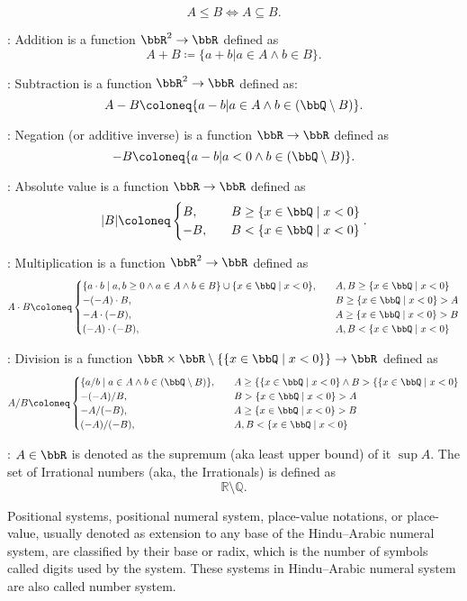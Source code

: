 \documentclass[a4paper,12pt]{report}
\begin{document}
\begin{itemizle}
\[A\leq B\iff A\subseteq B.\]
\item {}: Addition is a function $\bbR^2\to\bbR$ defined as
\[A+B\coloneq\{a+b|a\in A\land b\in B\}.\]
\item {}: Subtraction is a function $\bbR^2\to\bbR$ defined as:
\[A-B\coloneq\{a-b|a\in A\land b\in(\bbQ\setminus B)\}.\]
\item {}: Negation (or additive inverse) is a function $\bbR\to\bbR$ defined as
\[-B\coloneq\{a-b|a<0\land b\in(\bbQ\setminus B)\}.\]
\item {}: Absolute value is a function $\bbR\to\bbR$ defined as
\[|B|\coloneq\begin{cases}
B,\quad&B\geq\{x\in\bbQ\mid x<0\}\\
-B,\quad&B<\{x\in\bbQ\mid x<0\}
\end{cases}.\]
\item {}: Multiplication is a function $\bbR^2\to\bbR$ defined as
\[A\cdot B\coloneq\begin{cases}
\{a\cdot b\mid a,b\geq 0\land a\in A\land b\in B\}\cup\{x\in\bbQ\mid x<0\},\quad&A,B\geq\{x\in\bbQ\mid x<0\}\\
-(-A)\cdot B,\quad&B\geq\{x\in\bbQ\mid x<0\}>A\\
-A\cdot (-B),\quad&A\geq\{x\in\bbQ\mid x<0\}>B\\
(-A)\cdot (-B),\quad&A,B<\{x\in\bbQ\mid x<0\}
\end{cases}\]
\item {}: Division is a function $\bbR\times\bbR\setminus\{\{x\in\bbQ\mid x<0\}\}\to\bbR$ defined as
\[A/B\coloneq\begin{cases}
\{a/b\mid a\in A\land b\in(\bbQ\setminus B)\},\quad&A\geq\{\{x\in\bbQ\mid x<0\}\land B>\{\{x\in\bbQ\mid x<0\}\\
-(-A)/B,\quad&B>\{x\in\bbQ\mid x<0\}>A\\
-A/(-B),\quad&A\geq\{x\in\bbQ\mid x<0\}>B\\
(-A)/(-B),\quad&A,B<\{x\in\bbQ\mid x<0\}
\end{cases}\]
\item {}: $A\in\bbR$ is denoted as the supremum (aka least upper bound) of it $\sup A$.
\eit
{}
The set of Irrational numbers (aka, the Irrationals) is defined as
\[\mathbb{R}\setminus\mathbb{Q}.\]


Positional systems, positional numeral system, place-value notations, or place-value, usually denoted as extension to any base of the Hindu–Arabic numeral system, are classified by their base or radix, which is the number of symbols called digits used by the system. These systems in Hindu–Arabic numeral system are also called number system.


\end{itemizle}
\end{document}

